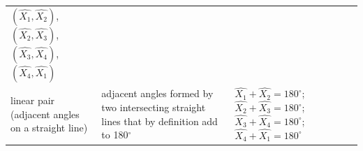 {\begin{center}
\begin{xtabular*}{\mytablewidth}[t]{|p{10\mystarwidth}|p{10\mystarwidth}|p{10\mystarwidth}|}
        \begin{math}\left(\hat{{X}_{1}},\hat{{X}_{2}}\right)\end{math}, \begin{math}\left(\hat{{X}_{2}},\hat{{X}_{3}}\right)\end{math}, \begin{math}\left(\hat{{X}_{3}},\hat{{X}_{4}}\right)\end{math}, \begin{math}\left(\hat{{X}_{4}},\hat{{X}_{1}}\right)\end{math}%
     \tabularnewline{}
    
    
        linear pair (adjacent angles on a straight line) &
    
    
        adjacent angles formed by two intersecting straight lines that by definition add to 180\begin{math}{}^{\circ }\end{math} &
    
    
        
                  \begin{math}\hat{{X}_{1}}+\hat{{X}_{2}}={180}^{\circ }\end{math};
                  \begin{math}\hat{{X}_{2}}+\hat{{X}_{3}}={180}^{\circ }\end{math};
                  \begin{math}\hat{{X}_{3}}+\hat{{X}_{4}}={180}^{\circ }\end{math};
                  \begin{math}\hat{{X}_{4}}+\hat{{X}_{1}}={180}^{\circ }\end{math}
     \tabularnewline{}
    

\end{xtabular*}
\end{center}}
